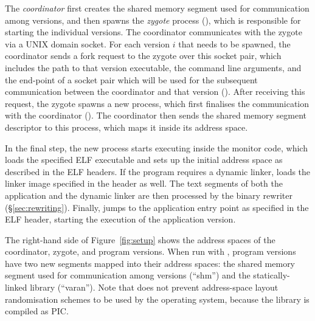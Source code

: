 

The \emph{coordinator} first creates the shared memory segment
used for communication among versions, and then spawns the
\textit{zygote} process (), which is responsible for starting
the individual versions. The coordinator communicates with the zygote
via a UNIX domain socket. For each version $i$ that needs to be spawned,
the coordinator sends a fork request to the zygote over this socket
pair, which includes the path to that version executable, the command
line arguments, and the end-point of a socket pair which will be used
for the subsequent communication between the coordinator and that
version ().
%
After receiving this request, the zygote spawns a new process, which
first finalises the communication with the coordinator
().  The coordinator then sends the shared memory
segment descriptor to this process, which maps it inside its address
space.


In the final step, the new process starts executing inside the monitor
code, which loads the specified ELF executable and sets up the initial
address space as described in the ELF headers. If the program requires
a dynamic linker, \varan loads the linker image specified in the
header as well.
The text segments of both the application and the dynamic linker are
then processed by the binary rewriter (\S\ref{sec:rewriting}). Finally,
\varan jumps to the application entry point as specified in the ELF header,
starting the execution of the application version.

The right-hand side of Figure~\ref{fig:setup} shows the address spaces
of the coordinator, zygote, and program versions.  When run with
\varan, program versions have two new segments mapped into their
address spaces: the shared memory segment used for communication among
versions (``shm'') and the \varan statically-linked library
(``varan'').  Note that \varan does not prevent address-space layout
randomisation schemes to be used by the operating system, because the
\varan library is compiled as PIC.

